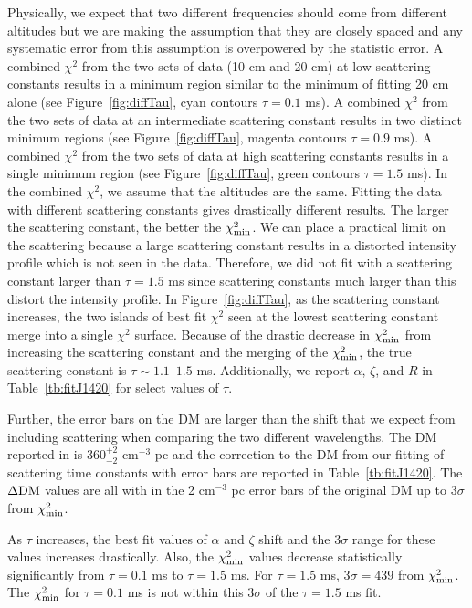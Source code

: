 Physically, we expect that two different 
frequencies should come from different altitudes but we
are making the assumption that they are closely spaced and any systematic error from this assumption
is overpowered by the statistic error.
A combined $\chi^{2}$ from the two sets of data 
(10 cm and 20 cm) at low scattering constants results in 
a minimum region similar to the minimum of fitting 20 cm 
alone (see Figure~\ref{fig:diffTau}, cyan contours $\tau=0.1$ ms).
A combined $\chi^{2}$ from the two sets of data at 
an intermediate scattering constant results in
two distinct minimum regions (see Figure~\ref{fig:diffTau}, 
magenta contours $\tau=0.9$ ms).  
A combined $\chi^{2}$ from the two sets of data 
at high scattering constants results in
a single minimum region (see Figure~\ref{fig:diffTau}, 
green contours $\tau=1.5$ ms).
In the combined $\chi^{2}$, we assume that the altitudes are the same.
Fitting the data with different scattering constants gives drastically different results.
The larger the scattering constant, the better the $\chi^{2}_{\rm{min}}$.  
We can place a practical
limit on the scattering because a large scattering constant results in a distorted intensity 
profile which is not seen in the data.  
Therefore, we did not fit with a scattering constant larger
than $\tau=1.5$ ms since scattering constants much 
larger than this distort the intensity profile.
In Figure~\ref{fig:diffTau}, as the scattering constant increases, the two islands of 
best fit $\chi^2$ seen at the lowest scattering constant merge into a single $\chi^2$ surface.
Because of the drastic decrease in $\chi^{2}_{\rm{min}}$ from increasing the scattering
constant and the merging of the $\chi^{2}_{\rm{min}}$, the true scattering constant 
is $\tau\sim 1.1$--$1.5$ ms.  Additionally, we report $\alpha$, $\zeta$, and $R$ in
Table~\ref{tb:fitJ1420} for select values of $\tau$. 

Further, the error bars on the DM are larger than the shift that we 
expect from including scattering when comparing the two different wavelengths.
The DM reported in \citet{weltevrede2010gamma} 
is $360^{+2}_{-2}$ cm$^{-3}$ pc and the correction to the 
DM from our fitting of scattering time constants with 
error bars are reported in Table~\ref{tb:fitJ1420}.
The $\Delta \rm{DM}$ values are all with in the 2 cm$^{-3}$ 
pc error bars of the original DM up to 
$3\sigma$ from $\chi^2_{\rm{min}}$.

As $\tau$ increases, the best fit values of $\alpha$ and $\zeta$ shift and the $3\sigma$ range
for these values increases drastically.  
Also, the $\chi^2_{\rm{min}}$ values decrease statistically 
significantly from $\tau=0.1$ ms to $\tau=1.5$ ms.  
For $\tau=1.5$ ms, $3\sigma=439$ from $\chi^2_{\rm{min}}$.
The $\chi^2_{\rm{min}}$ for $\tau=0.1$ ms is not within 
this $3\sigma$ of the $\tau=1.5$ ms fit.

